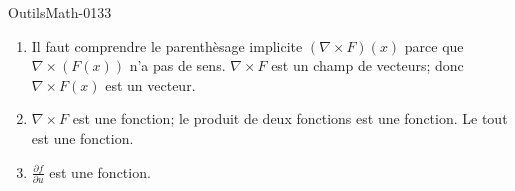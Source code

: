 
\begin{corrige}{OutilsMath-0133}

    \begin{enumerate}
        \item
            Il faut comprendre le parenthèsage implicite \( (\nabla\times F)(x)\) parce que \( \nabla\times(F(x))\) n'a pas de sens. \( \nabla\times F\) est un champ de vecteurs; donc \( \nabla\times F(x)\) est un vecteur.
        \item
            \( \nabla\times F\) est une fonction; le produit de deux fonctions est une fonction. Le tout est une fonction.
        \item
            $\frac{ \partial f }{ \partial u }$ est une fonction.
    \end{enumerate}

\end{corrige}
